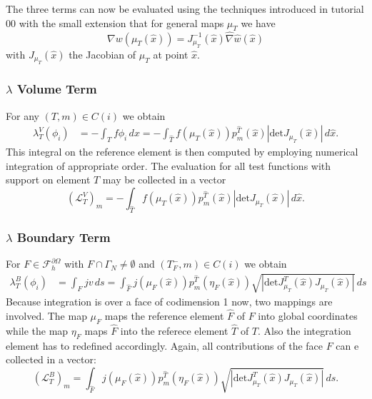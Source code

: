 \documentclass[a4paper,12pt]{article}
\begin{document}
The three terms can now be evaluated using the techniques introduced in
tutorial 00 with the small extension that for general maps $\mu_T$ we
have
$$\nabla w(\mu_T(\hat x)) = J_{\mu_T}^{-1}(\hat x) \hat\nabla \hat w (\hat x)$$
with $J_{\mu_T}(\hat x)$ the Jacobian of $\mu_T$ at point $\hat x$.

\subsubsection*{$\lambda$ Volume Term}

For any $(T,m)\in C(i)$ we obtain
\begin{equation*}
\begin{split}
\lambda_T^V(\phi_i) &= - \int_T f \phi_i \,dx =
- \int_{\hat T} f(\mu_T(\hat x)) p_m^{\hat T}(\hat x) |\text{det} J_{\mu_T}(\hat x)|\, d\hat x .
\end{split}
\end{equation*}
This integral on the reference element is then computed by employing
numerical integration of appropriate order.
The evaluation for all test functions with support on element $T$ may be collected in
a vector
\begin{equation*}
(\mathcal{L}_T^V)_m = - \int_{\hat T} f(\mu_T(\hat x)) p_m^{\hat T}(\hat x)
|\text{det} J_{\mu_T}(\hat x)|\, d\hat x.
\end{equation*}

\subsubsection*{$\lambda$ Boundary Term}

For $F\in\mathcal{F}_h^{\partial\Omega}$ with $F\cap\Gamma_N\neq\emptyset$
and $(T_F^-,m)\in C(i)$ we obtain
\begin{equation*}
\begin{split}
\lambda_T^B(\phi_i) &= \int_{F} j v\,ds =
\int_{\hat F} j(\mu_F(\hat x)) p_m^{\hat T}(\eta_F(\hat x))
\sqrt{|\text{det} J^T_{\mu_T}(\hat x)J_{\mu_T}(\hat x)|} \,ds
\end{split}
\end{equation*}
Because integration is over a face of codimension 1 now, two mappings are
involved. The map $\mu_F$ maps the reference element $\hat F$ of $F$ into
global coordinates while the map $\eta_F$ maps $\hat F$ into the referece
element $\hat T$ of $T$. Also the integration element has to redefined accordingly.
Again, all contributions of the face $F$ can e collected in a vector:
\begin{equation*}
(\mathcal{L}_T^B)_m =
\int_{\hat F} j(\mu_F(\hat x)) p_m^{\hat T}(\eta_F(\hat x))
\sqrt{|\text{det} J^T_{\mu_T}(\hat x)J_{\mu_T}(\hat x)|} \,ds .
\end{equation*}
\end{document}

